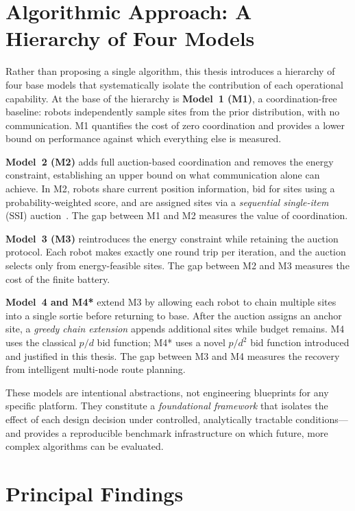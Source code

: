 \begin{doublespacing}
\section{Algorithmic Approach: A Hierarchy of Four Models}

Rather than proposing a single algorithm, this thesis introduces a
hierarchy of four base models that systematically isolate the
contribution of each operational capability.
At the base of the hierarchy is \textbf{Model~1 (M1)}, a
coordination-free baseline: robots independently sample sites from
the prior distribution, with no communication.
M1 quantifies the cost of zero coordination and provides a lower
bound on performance against which everything else is measured.

\textbf{Model~2 (M2)} adds full auction-based coordination and removes
the energy constraint, establishing an upper bound on what
communication alone can achieve.
In M2, robots share current position information, bid for sites using a
probability-weighted score, and are assigned sites via a \emph{sequential
single-item} (SSI) auction~\citep{Koenig2006}.
The gap between M1 and M2 measures the value of coordination.

\textbf{Model~3 (M3)} reintroduces the energy constraint while retaining
the auction protocol.
Each robot makes exactly one round trip per iteration, and the auction
selects only from energy-feasible sites.
The gap between M2 and M3 measures the cost of the finite battery.

\textbf{Model~4 and M4*} extend M3 by allowing each robot to chain
multiple sites into a single sortie before returning to base.
After the auction assigns an anchor site, a \emph{greedy chain extension}
appends additional sites while budget remains.
M4 uses the classical $p/d$ bid function; M4* uses a novel
$p/d^2$ bid function introduced and justified in this thesis.
The gap between M3 and M4 measures the recovery from intelligent
multi-node route planning.

These models are intentional abstractions, not engineering blueprints
for any specific platform.
They constitute a \emph{foundational framework} that isolates the
effect of each design decision under controlled, analytically
tractable conditions---and provides a reproducible benchmark
infrastructure on which future, more complex algorithms can be
evaluated.

\section{Principal Findings}


\end{doublespacing}
